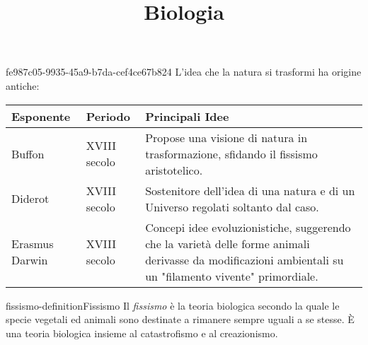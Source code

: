 \documentclass[preview]{standalone}
\begin{document}
\title{Biologia}
\genpage

\begin{snippet}{fe987c05-9935-45a9-b7da-cef4ce67b824}
    L'idea che la natura si trasformi ha origine antiche: \\
    \begin{table}[htbp]
        \centering
        \begin{tabularx}{0.85\textwidth}{|l|l|X|}
            \hline 
            Esponente & Periodo & Principali Idee \\
            \hline 
            Buffon & XVIII secolo & Propose una visione di natura in trasformazione, sfidando il fissismo aristotelico. \\
            \hline 
            Diderot & XVIII secolo & Sostenitore dell'idea di una natura e di un Universo regolati soltanto dal caso. \\
            \hline 
            Erasmus Darwin & XVIII secolo & Concepi idee evoluzionistiche, suggerendo che la varietà delle forme animali derivasse da modificazioni ambientali su un "filamento vivente" primordiale. \\
            \hline
        \end{tabularx}
    \end{table}
    \vspace{0.25cm}
\end{snippet}

\begin{snippetdefinition}{fissismo-definition}{Fissismo}
    Il \textit{fissismo} è la teoria biologica secondo la quale le specie vegetali ed animali sono destinate a rimanere sempre uguali a se stesse. È una teoria biologica insieme al catastrofismo e al creazionismo. 
\end{snippetdefinition}
\end{document}
